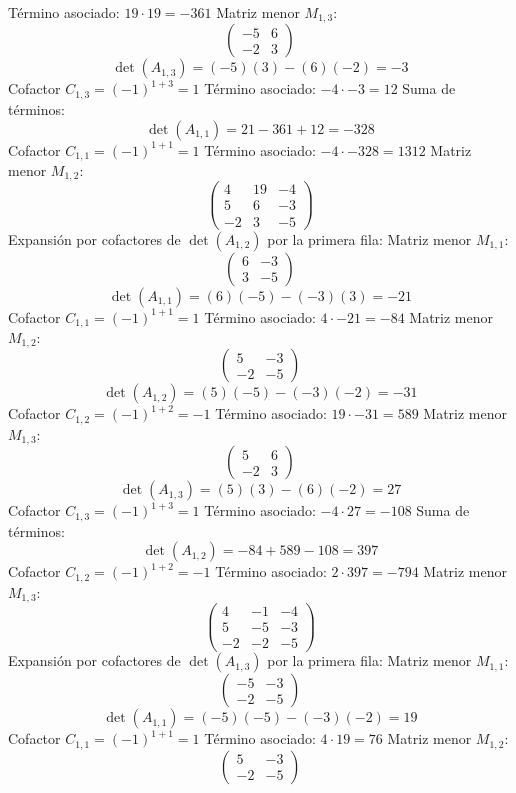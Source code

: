 \documentclass{article}
\begin{document}
Término asociado: $ 19 \cdot 19 = -361 $
Matriz menor $M_{1,3}$:
\[\begin{pmatrix}-5 & 6 \\ -2 & 3\end{pmatrix}\]
\[\det(A_{1,3}) = (-5)(3) - (6)(-2) = -3\]
Cofactor $C_{1,3} = (-1)^{1+3} = 1$
Término asociado: $ -4 \cdot -3 = 12 $
Suma de términos:
\[\det(A_{1,1}) = 21 - 361 + 12 = -328\]
Cofactor $C_{1,1} = (-1)^{1+1} = 1$
Término asociado: $ -4 \cdot -328 = 1312 $
Matriz menor $M_{1,2}$:
\[\begin{pmatrix}4 & 19 & -4 \\ 5 & 6 & -3 \\ -2 & 3 & -5\end{pmatrix}\]
Expansión por cofactores de $\det(A_{1,2})$ por la primera fila:
Matriz menor $M_{1,1}$:
\[\begin{pmatrix}6 & -3 \\ 3 & -5\end{pmatrix}\]
\[\det(A_{1,1}) = (6)(-5) - (-3)(3) = -21\]
Cofactor $C_{1,1} = (-1)^{1+1} = 1$
Término asociado: $ 4 \cdot -21 = -84 $
Matriz menor $M_{1,2}$:
\[\begin{pmatrix}5 & -3 \\ -2 & -5\end{pmatrix}\]
\[\det(A_{1,2}) = (5)(-5) - (-3)(-2) = -31\]
Cofactor $C_{1,2} = (-1)^{1+2} = -1$
Término asociado: $ 19 \cdot -31 = 589 $
Matriz menor $M_{1,3}$:
\[\begin{pmatrix}5 & 6 \\ -2 & 3\end{pmatrix}\]
\[\det(A_{1,3}) = (5)(3) - (6)(-2) = 27\]
Cofactor $C_{1,3} = (-1)^{1+3} = 1$
Término asociado: $ -4 \cdot 27 = -108 $
Suma de términos:
\[\det(A_{1,2}) = -84 + 589 - 108 = 397\]
Cofactor $C_{1,2} = (-1)^{1+2} = -1$
Término asociado: $ 2 \cdot 397 = -794 $
Matriz menor $M_{1,3}$:
\[\begin{pmatrix}4 & -1 & -4 \\ 5 & -5 & -3 \\ -2 & -2 & -5\end{pmatrix}\]
Expansión por cofactores de $\det(A_{1,3})$ por la primera fila:
Matriz menor $M_{1,1}$:
\[\begin{pmatrix}-5 & -3 \\ -2 & -5\end{pmatrix}\]
\[\det(A_{1,1}) = (-5)(-5) - (-3)(-2) = 19\]
Cofactor $C_{1,1} = (-1)^{1+1} = 1$
Término asociado: $ 4 \cdot 19 = 76 $
Matriz menor $M_{1,2}$:
\[\begin{pmatrix}5 & -3 \\ -2 & -5\end{pmatrix}\]
\end{document}
